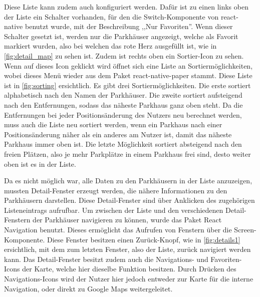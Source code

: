 Diese Liste kann zudem auch konfiguriert werden. Dafür ist zu einen links oben der Liste ein Schalter vorhanden, für den die Switch-Komponente von react-native benutzt wurde, mit der Beschreibung ,,Nur Favoriten''. Wenn dieser Schalter gesetzt ist, werden nur die Parkhäuser angezeigt, welche als Favorit markiert wurden, also bei welchen das rote Herz ausgefüllt ist, wie in \autoref{fig:detail_map} zu sehen ist. Zudem ist rechts oben ein Sortier-Icon zu sehen. Wenn auf dieses Icon geklickt wird öffnet sich eine Liste an Sortiermöglichkeiten, wobei dieses Menü wieder aus dem Paket react-native-paper stammt. Diese Liste ist in \autoref{fig:sorting} ersichtlich. Es gibt drei Sortiermöglichkeiten. Die erste sortiert alphabetisch nach den Namen der Parkhäuser. Die zweite sortiert aufsteigend nach den Entfernungen, sodass das näheste Parkhaus ganz oben steht. Da die Entfernungen bei jeder Positionsänderung des Nutzers neu berechnet werden, muss auch die Liste neu sortiert werden, wenn ein Parkhaus nach einer Positionsänderung näher als ein anderes am Nutzer ist, damit das näheste Parkhaus immer oben ist. Die letzte Möglichkeit sortiert absteigend nach den freien Plätzen, also je mehr Parkplätze in einem Parkhaus frei sind, desto weiter oben ist es in der Liste.

Da es nicht möglich war, alle Daten zu den Parkhäusern in der Liste anzuzeigen, mussten Detail-Fenster erzeugt werden, die nähere Informationen zu den Parkhäusern darstellen. Diese Detail-Fenster sind über Anklicken des zugehörigen Listeneintrags aufrufbar. Um zwischen der Liste und den verschiedenen Detail-Fenstern der Parkhäuser navigieren zu können, wurde das Paket React Navigation benutzt. Dieses ermöglicht das Aufrufen von Fenstern über die Screen-Komponente. Diese Fenster besitzen einen Zurück-Knopf, wie in \autoref{fig:details1} ersichtlich, mit dem zum letzten Fenster, also der Liste, zurück navigiert werden kann. Das Detail-Fenster besitzt zudem auch die Navigations- und Favoriten-Icons der Karte, welche hier dieselbe Funktion besitzen. Durch Drücken des Navigations-Icons wird der Nutzer hier jedoch entweder zur Karte für die interne Navigation, oder direkt zu Google Maps weitergeleitet.

